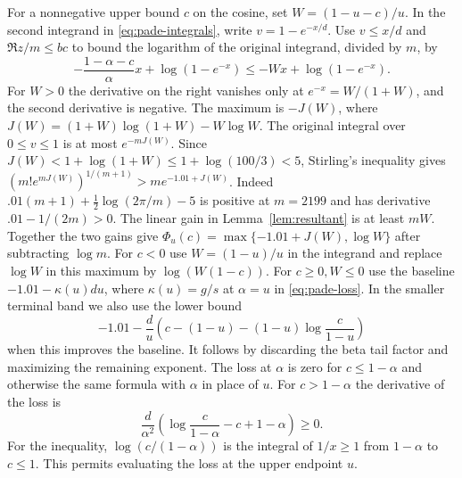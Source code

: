 For a nonnegative upper bound \(c\) on the cosine, set
\(W=(1-u-c)/u\). In the second integrand in
\eqref{eq:pade-integrals}, write \(v=1-e^{-x/d}\).
Use \(v\le x/d\) and \(\Re z/m\le bc\) to bound the logarithm
of the original integrand, divided by \(m\), by
\[
 -\frac{1-\alpha-c}{\alpha}x+\log(1-e^{-x})
 \le -Wx+\log(1-e^{-x}).
\]
For \(W>0\) the derivative on the right vanishes only at
\(e^{-x}=W/(1+W)\), and the second derivative is negative.
The maximum is \(-J(W)\), where
\(J(W)=(1+W)\log(1+W)-W\log W\).
The original integral over \(0\le v\le1\) is at most
\(e^{-mJ(W)}\). Since \(J(W)<1+\log(1+W)\le
1+\log(100/3)<5\), Stirling's inequality gives
\((m!e^{mJ(W)})^{1/(m+1)}>me^{-1.01+J(W)}\).
Indeed \(.01(m+1)+\tfrac12\log(2\pi/m)-5\) is positive at
\(m=2199\) and has derivative \(.01-1/(2m)>0\).
The linear gain in Lemma~\ref{lem:resultant} is at least \(mW\).
Together the two gains give
\(\Phi_u(c)=\max\{-1.01+J(W),\log W\}\) after subtracting
\(\log m\).
For \(c<0\) use \(W=(1-u)/u\) in the integrand and
replace \(\log W\) in this maximum by \(\log(W(1-c))\).
For \(c\ge0,W\le0\) use the baseline
\(-1.01-\kappa(u)du\), where \(\kappa(u)=g/s\) at \(\alpha=u\)
in \eqref{eq:pade-loss}.
In the smaller terminal band we also use the lower bound
\[
 -1.01-\frac d u
       \left(c-(1-u)-(1-u)\log\frac{c}{1-u}\right)
\]
when this improves the baseline. It follows by discarding
the beta tail factor and maximizing the remaining exponent.
The loss at \(\alpha\) is zero for \(c\le1-\alpha\) and
otherwise the same formula with \(\alpha\) in place of \(u\).
For \(c>1-\alpha\) the derivative of the loss is
\[
 \frac d{\alpha^2}
 \left(\log\frac{c}{1-\alpha}-c+1-\alpha\right)\ge0.
\]
For the inequality, \(\log(c/(1-\alpha))\) is the integral
of \(1/x\ge1\) from \(1-\alpha\) to \(c\le1\).
This permits evaluating the loss at the upper endpoint \(u\).

